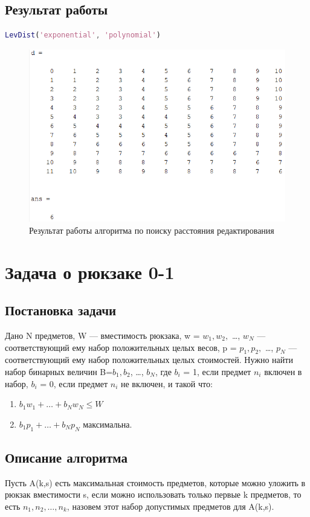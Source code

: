 \documentclass{article}
\begin{document}
\subsection{Результат работы}
\begin{lstlisting}[language={Matlab}, caption={Тест. Расстояние редактирования}, label={Script}]
LevDist('exponential', 'polynomial')
\end{lstlisting}
\begin{figure}[h]
	\centering
	\includegraphics[width=0.75\linewidth]{LevDist.png}
	\caption{Результат работы алгоритма по поиску расстояния редактирования}
\end{figure}
\section{Задача о рюкзаке 0-1}
\subsection{Постановка задачи}
Дано N предметов, W — вместимость рюкзака, w = {$w_{1}, w_{2},$ \ldots , $w_{N}$} — соответствующий ему набор положительных целых весов, p = {$p_{1}, p_{2},$ \ldots , $p_{N}$} — соответствующий ему набор положительных целых стоимостей. Нужно найти набор бинарных величин B={$b_{1}, b_{2}$, \ldots , $b_{N}$}, где $b_{i}$ = 1, если предмет $n_{i}$ включен в набор, $b_{i}$ = 0, если предмет $n_{i}$ не включен, и такой что:
\begin{enumerate}
	\item $b_{1}w_{1}+ \ldots + b_{N}w_{N} \leq W$
	\item $b_{1}p_{1}+\ldots+b_{N}p_{N}$ максимальна.
\end{enumerate}
\subsection{Описание алгоритма}
Пусть A(k,s) есть максимальная стоимость предметов, которые можно уложить в рюкзак вместимости s, если можно использовать только первые k предметов, то есть ${n_{1},n_{2}, \ldots ,n_{k}}$, назовем этот набор допустимых предметов для A(k,s).\\
\end{document}
